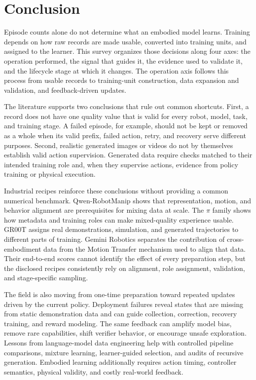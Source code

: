 \section{Conclusion}
\label{sec:conclusion}

Episode counts alone do not determine what an embodied model learns.
Training depends on how raw records are made usable, converted into training units, and assigned to the learner.
This survey organizes those decisions along four axes: the operation performed, the signal that guides it, the evidence used to validate it, and the lifecycle stage at which it changes.
The operation axis follows this process from usable records to training-unit construction, data expansion and validation, and feedback-driven updates.

The literature supports two conclusions that rule out common shortcuts.
First, a record does not have one quality value that is valid for every robot, model, task, and training stage.
A failed episode, for example, should not be kept or removed as a whole when its valid prefix, failed action, retry, and recovery serve different purposes.
Second, realistic generated images or videos do not by themselves establish valid action supervision.
Generated data require checks matched to their intended training role and, when they supervise actions, evidence from policy training or physical execution.

Industrial recipes reinforce these conclusions without providing a common numerical benchmark.
Qwen-RobotManip shows that representation, motion, and behavior alignment are prerequisites for mixing data at scale.
The $\pi$ family shows how metadata and training roles can make mixed-quality experience usable.
GR00T assigns real demonstrations, simulation, and generated trajectories to different parts of training.
Gemini Robotics separates the contribution of cross-embodiment data from the Motion Transfer mechanism used to align that data.
Their end-to-end scores cannot identify the effect of every preparation step, but the disclosed recipes consistently rely on alignment, role assignment, validation, and stage-specific sampling.

The field is also moving from one-time preparation toward repeated updates driven by the current policy.
Deployment failures reveal states that are missing from static demonstration data and can guide collection, correction, recovery training, and reward modeling.
The same feedback can amplify model bias, remove rare capabilities, shift verifier behavior, or encourage unsafe exploration.
Lessons from language-model data engineering help with controlled pipeline comparisons, mixture learning, learner-guided selection, and audits of recursive generation.
Embodied learning additionally requires action timing, controller semantics, physical validity, and costly real-world feedback.

